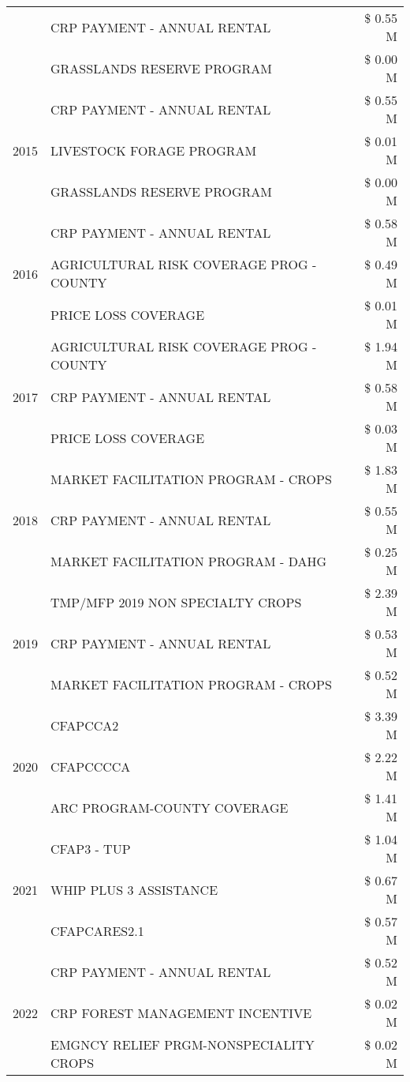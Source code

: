 \begin{tabular}{llr}
 & CRP PAYMENT - ANNUAL RENTAL & \$ 0.55 M \\
 & GRASSLANDS RESERVE PROGRAM & \$ 0.00 M \\
\cline{1-3}
\multirow[t]{3}{*}{2015} & CRP PAYMENT - ANNUAL RENTAL & \$ 0.55 M \\
 & LIVESTOCK FORAGE PROGRAM & \$ 0.01 M \\
 & GRASSLANDS RESERVE PROGRAM & \$ 0.00 M \\
\cline{1-3}
\multirow[t]{3}{*}{2016} & CRP PAYMENT - ANNUAL RENTAL & \$ 0.58 M \\
 & AGRICULTURAL RISK COVERAGE PROG - COUNTY & \$ 0.49 M \\
 & PRICE LOSS COVERAGE & \$ 0.01 M \\
\cline{1-3}
\multirow[t]{3}{*}{2017} & AGRICULTURAL RISK COVERAGE PROG - COUNTY & \$ 1.94 M \\
 & CRP PAYMENT - ANNUAL RENTAL & \$ 0.58 M \\
 & PRICE LOSS COVERAGE & \$ 0.03 M \\
\cline{1-3}
\multirow[t]{3}{*}{2018} & MARKET FACILITATION PROGRAM - CROPS & \$ 1.83 M \\
 & CRP PAYMENT - ANNUAL RENTAL & \$ 0.55 M \\
 & MARKET FACILITATION PROGRAM - DAHG & \$ 0.25 M \\
\cline{1-3}
\multirow[t]{3}{*}{2019} & TMP/MFP 2019 NON SPECIALTY CROPS & \$ 2.39 M \\
 & CRP PAYMENT - ANNUAL RENTAL & \$ 0.53 M \\
 & MARKET FACILITATION PROGRAM - CROPS & \$ 0.52 M \\
\cline{1-3}
\multirow[t]{3}{*}{2020} & CFAPCCA2 & \$ 3.39 M \\
 & CFAPCCCCA & \$ 2.22 M \\
 & ARC PROGRAM-COUNTY COVERAGE & \$ 1.41 M \\
\cline{1-3}
\multirow[t]{3}{*}{2021} & CFAP3 - TUP & \$ 1.04 M \\
 & WHIP PLUS 3 ASSISTANCE & \$ 0.67 M \\
 & CFAPCARES2.1 & \$ 0.57 M \\
\cline{1-3}
\multirow[t]{3}{*}{2022} & CRP PAYMENT - ANNUAL RENTAL & \$ 0.52 M \\
 & CRP FOREST MANAGEMENT INCENTIVE & \$ 0.02 M \\
 & EMGNCY RELIEF PRGM-NONSPECIALITY CROPS & \$ 0.02 M \\
\cline{1-3}
\bottomrule
\end{tabular}
